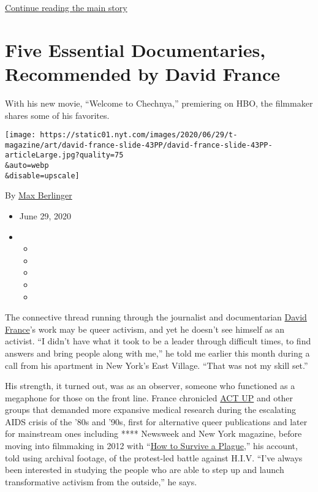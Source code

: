 \protect\hyperlink{after-sponsor}{Continue reading the main story}

\hypertarget{five-essential-documentaries-recommended-by-david-france}{%
\section{Five Essential Documentaries, Recommended by David
France}\label{five-essential-documentaries-recommended-by-david-france}}

With his new movie, ``Welcome to Chechnya,'' premiering on HBO, the
filmmaker shares some of his favorites.

\texttt{[image: https://static01.nyt.com/images/2020/06/29/t-magazine/art/david-france-slide-43PP/david-france-slide-43PP-articleLarge.jpg?quality=75\\\&auto=webp\\\&disable=upscale]}

By \href{https://www.nytimes.com/by/max-berlinger}{Max Berlinger}

\begin{itemize}
\item
  June 29, 2020
\item
  \begin{itemize}
  \item
  \item
  \item
  \item
  \item
  \end{itemize}
\end{itemize}

The connective thread running through the journalist and documentarian
\href{https://www.nytimes.com/interactive/2020/04/13/t-magazine/act-up-aids.html}{David
France}'s work may be queer activism, and yet he doesn't see himself as
an activist. ``I didn't have what it took to be a leader through
difficult times, to find answers and bring people along with me,'' he
told me earlier this month during a call from his apartment in New
York's East Village. ``That was not my skill set.''

His strength, it turned out, was as an observer, someone who functioned
as a megaphone for those on the front line. France chronicled
\href{https://www.nytimes.com/interactive/2020/04/13/t-magazine/act-up-aids.html}{ACT
UP} and other groups that demanded more expansive medical research
during the escalating AIDS crisis of the '80s and '90s, first for
alternative queer publications and later for mainstream ones including
**** Newsweek and New York magazine, before moving into filmmaking in
2012 with
``\href{https://www.nytimes.com/watching/recommendations/watching-film-how-to-survive-a-plague}{How
to Survive a Plague},'' his account, told using archival footage, of the
protest-led battle against H.I.V. ``I've always been interested in
studying the people who are able to step up and launch transformative
activism from the outside,'' he says.

